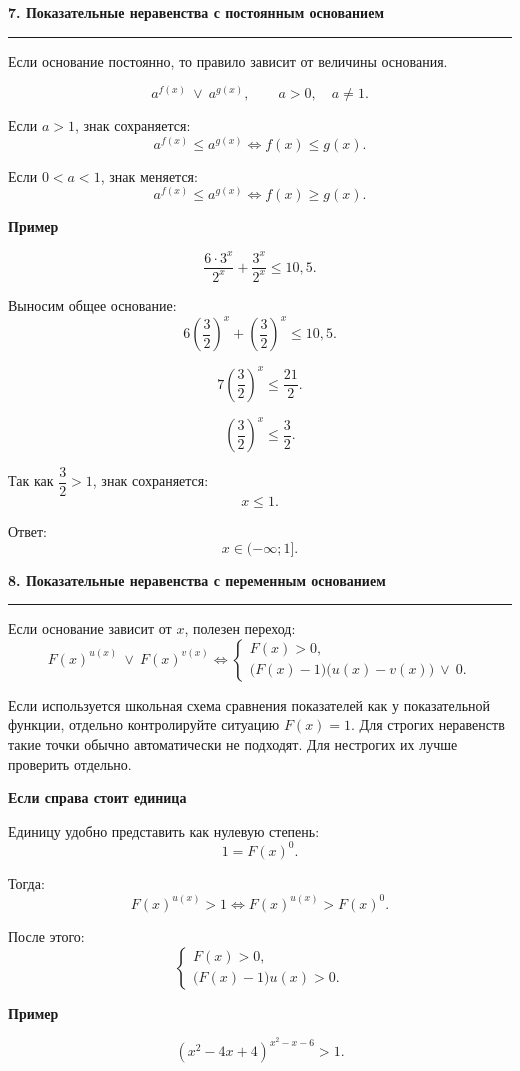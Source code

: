 \documentclass[a4paper,12pt]{article}
\newcommand{\SectionTitle}[1]{%
  \vspace{0.8em}
  {\Large\bfseries\textcolor{darkaccent}{#1}}\par
  \vspace{0.2em}
  {\color{accent}\rule{\linewidth}{0.8pt}}
  \vspace{0.4em}
}
\newcommand{\MiniTitle}[1]{%
  \vspace{0.45em}
  {\bfseries\textcolor{darkaccent}{#1}}\par
}
\begin{document}
\SectionTitle{7. Показательные неравенства с постоянным основанием}

Если основание постоянно, то правило зависит от величины основания.

\[
a^{f(x)}\ \vee\ a^{g(x)},\qquad a>0,\quad a\ne1.
\]

Если \(a>1\), знак сохраняется:
\[
a^{f(x)}\le a^{g(x)}
\Longleftrightarrow
f(x)\le g(x).
\]

Если \(0<a<1\), знак меняется:
\[
a^{f(x)}\le a^{g(x)}
\Longleftrightarrow
f(x)\ge g(x).
\]

\MiniTitle{Пример}

\[
\frac{6\cdot3^x}{2^x}+\frac{3^x}{2^x}\le10{,}5.
\]

Выносим общее основание:
\[
6\left(\frac32\right)^x+\left(\frac32\right)^x\le10{,}5.
\]

\[
7\left(\frac32\right)^x\le\frac{21}{2}.
\]

\[
\left(\frac32\right)^x\le\frac32.
\]

Так как \(\dfrac32>1\), знак сохраняется:
\[
x\le1.
\]

Ответ:
\[
\boxed{x\in(-\infty;1]}.
\]

\SectionTitle{8. Показательные неравенства с переменным основанием}

Если основание зависит от \(x\), полезен переход:
\[
\boxed{
F(x)^{u(x)}\ \vee\ F(x)^{v(x)}
\Longleftrightarrow
\begin{cases}
F(x)>0,\\
\bigl(F(x)-1\bigr)\bigl(u(x)-v(x)\bigr)\ \vee\ 0.
\end{cases}
}
\]

Если используется школьная схема сравнения показателей как у показательной функции, отдельно контролируйте ситуацию \(F(x)=1\). Для строгих неравенств такие точки обычно автоматически не подходят. Для нестрогих их лучше проверить отдельно.

\MiniTitle{Если справа стоит единица}

Единицу удобно представить как нулевую степень:
\[
1=F(x)^0.
\]

Тогда:
\[
F(x)^{u(x)}>1
\Longleftrightarrow
F(x)^{u(x)}>F(x)^0.
\]

После этого:
\[
\begin{cases}
F(x)>0,\\
\bigl(F(x)-1\bigr)u(x)>0.
\end{cases}
\]

\MiniTitle{Пример}

\[
(x^2-4x+4)^{x^2-x-6}>1.
\]
\end{document}
